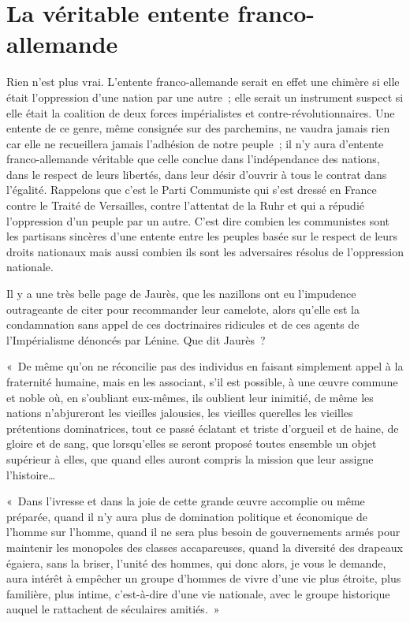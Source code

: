 \documentclass[french,twoside]{book} %
\newenvironment{quoteblock}%
  {\begin{quoting}}
  {\end{quoting}}
\newenvironment{quotebar}{%
    \def\FrameCommand{{\color{rubric!10!}\vrule width 0.5em} \hspace{0.9em}}%
    \def\OuterFrameSep{\itemsep} %
    \MakeFramed {\advance\hsize-\width \FrameRestore}
  }%
  {%
    \endMakeFramed
  }
\renewenvironment{quoteblock}%
  {%
    \savenotes
    \setstretch{0.9}
    \normalfont
    \begin{quotebar}
  }
  {%
    \end{quotebar}
    \spewnotes
  }
\begin{document}
\section[{La véritable entente franco-allemande}]{La véritable entente franco-allemande}
\noindent Rien n’est plus vrai. L’entente franco-allemande serait en effet une chimère si elle était l’oppression d’une nation par une autre ; elle serait un instrument suspect si elle était la coalition de deux forces impérialistes et contre-révolutionnaires. Une entente de ce genre, même consignée sur des parchemins, ne vaudra jamais rien car elle ne recueillera jamais l’adhésion de notre peuple ; il n’y aura d’entente franco-allemande véritable que celle conclue dans l’indépendance des nations, dans le respect de leurs libertés, dans leur désir d’ouvrir à tous le contrat dans l’égalité. Rappelons que c’est le Parti Communiste qui s’est dressé en France contre le Traité de Versailles, contre l’attentat de la Ruhr et qui a répudié l’oppression d’un peuple par un autre. C’est dire combien les communistes sont les partisans sincères d’une entente entre les peuples basée sur le respect de leurs droits nationaux mais aussi combien ils sont les adversaires résolus de l’oppression nationale.\par
Il y a une très belle page de Jaurès, que les nazillons ont eu l’impudence outrageante de citer pour recommander leur camelote, alors qu’elle est la condamnation sans appel de ces doctrinaires ridicules et de ces agents de l’Impérialisme dénoncés par Lénine. Que dit Jaurès ?\par

\begin{quoteblock}
 \noindent « De même qu’on ne réconcilie pas des individus en faisant simplement appel à la fraternité humaine, mais en les associant, s’il est possible, à une œuvre commune et noble où, en s’oubliant eux-mêmes, ils oublient leur inimitié, de même les nations n’abjureront les vieilles jalousies, les vieilles querelles les vieilles prétentions dominatrices, tout ce passé éclatant et triste d’orgueil et de haine, de gloire et de sang, que lorsqu’elles se seront proposé toutes ensemble un objet supérieur à elles, que quand elles auront compris la mission que leur assigne l’histoire…\par
 « Dans l’ivresse et dans la joie de cette grande œuvre accomplie ou même préparée, quand il n’y aura plus de domination politique et économique de l’homme sur l’homme, quand il ne sera plus besoin de gouvernements armés pour maintenir les monopoles des classes accapareuses, quand la diversité des drapeaux égaiera, sans la briser, l’unité des hommes, qui donc alors, je vous le demande, aura intérêt à empêcher un groupe d’hommes de vivre d’une vie plus étroite, plus familière, plus intime, c’est-à-dire d’une vie nationale, avec le groupe historique auquel le rattachent de séculaires amitiés. »
 \end{quoteblock}
\end{document}
